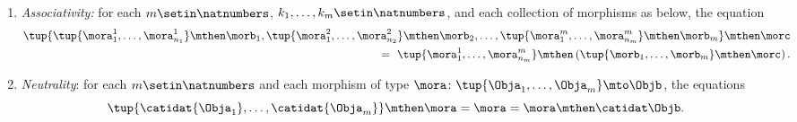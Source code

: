 \begin{ctdefinition}[Multicategory]
\begin{enumerate}
        \item \emph{Associativity:} for each $m \setin \natnumbers$, $k_1, \dots, k_m \setin \natnumbers$, and each collection of morphisms as below, the equation
              \begin{equation}
                  \begin{aligned}
                       \tup{ \tup{\mora_{1}^1,\ldots, \mora_{n_1}^1} \mthen \morb_1, \tup{\mora_{1}^2,\ldots, \mora_{n_2}^2 }\mthen \morb_2,\ldots, \tup{ \mora_{1}^m,\ldots, \mora_{n_m}^m } \mthen \morb_m } \mthen \morc \\ = \ \tup{ \mora_{1}^1,\ldots, \mora_{n_m}^m } \mthen \left ( \tup{ \morb_{1},\ldots, \morb_{m} } \mthen \morc \right ).
                  \end{aligned}
              \end{equation}
        \item \emph{Neutrality}: for each $m \setin \natnumbers$ and each morphism of type $\mora \colon \tup{\Obja_1,\ldots,\Obja_m}\mto \Objb$, the equations
              \begin{equation}
                  \tup{\catidat{\Obja_1},\ldots, \catidat{\Obja_m}}
                  \mthen \mora = \mora = \mora \mthen \catidat\Objb.
              \end{equation}
    \end{enumerate}
\end{ctdefinition}




